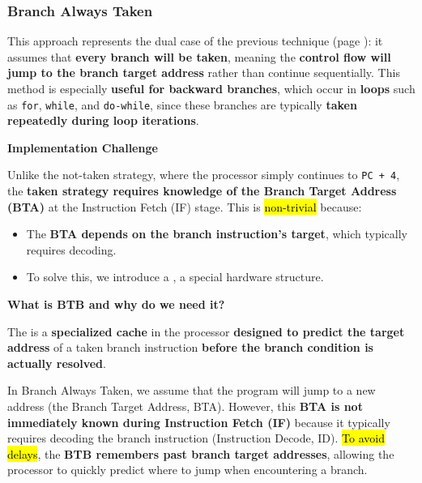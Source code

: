 \subsubsection{Branch Always Taken}

This approach represents the dual case of the previous technique (page \pageref{subsubsection: Branch Always Not Taken}): it assumes that \textbf{every branch will be taken}, meaning the \textbf{control flow will jump to the branch target address} rather than continue sequentially. This method is especially \textbf{useful for backward branches}, which occur in \textbf{loops} such as \texttt{for}, \texttt{while}, and \texttt{do-while}, since these branches are typically \textbf{taken repeatedly during loop iterations}.

\highspace
\begin{flushleft}
    \textcolor{Red2}{ \textbf{Implementation Challenge}}
\end{flushleft}
Unlike the not-taken strategy, where the processor simply continues to \texttt{PC + 4}, the \textbf{taken strategy requires knowledge of the Branch Target Address (BTA)} at the Instruction Fetch (IF) stage. This is \hl{non-trivial} because:
\begin{itemize}
    \item[\textcolor{Red2}{\faIcon{question-circle}}] The \textbf{BTA depends on the branch instruction's target}, which typically requires decoding.
    \item[\textcolor{Green3}{\faIcon{check}}] To solve this, we introduce a , a special hardware structure.
\end{itemize}

\highspace
\begin{flushleft}
    \textcolor{Green3}{ \textbf{What is BTB and why do we need it?}}
\end{flushleft}
The  is a \textbf{specialized cache} in the processor \textbf{designed to predict the target address} of a taken branch instruction \textbf{before the branch condition is actually resolved}. 

\highspace
In Branch Always Taken, we assume that the program will jump to a new address (the Branch Target Address, BTA). However, this \textbf{BTA is not immediately known during Instruction Fetch (IF)} because it typically requires decoding the branch instruction (Instruction Decode, ID). \hl{To avoid delays}, the \textbf{BTB remembers past branch target addresses}, allowing the processor to quickly predict where to jump when encountering a branch.

